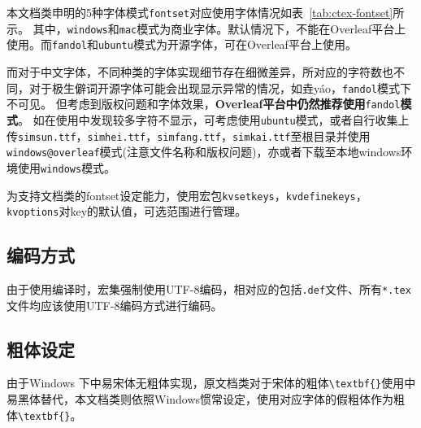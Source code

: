 本文档类申明的5种字体模式\verb|fontset|对应使用字体情况如表~\ref{tab:ctex-fontset}所示。
其中，\verb|windows|和\verb|mac|模式为商业字体。默认情况下，不能在Overleaf平台上使用。而\verb|fandol|和\verb|ubuntu|模式为开源字体，可在Overleaf平台上使用。

而对于中文字体，不同种类的字体实现细节存在细微差异，所对应的字符数也不同，对于极生僻词开源字体可能会出现显示异常的情况，如垚y\'ao，\verb|fandol|模式下不可见。
但考虑到版权问题和字体效果，\textbf{Overleaf平台中仍然推荐使用}\verb|fandol|\textbf{模式}。
如在使用中发现较多字符不显示，可考虑使用\verb|ubuntu|模式，或者自行收集上传\verb|simsun.ttf|，\verb|simhei.ttf|，\verb|simfang.ttf|，\verb|simkai.ttf|至根目录并使用\verb|windows@overleaf|模式(注意文件名称和版权问题)，亦或者下载至本地windows环境使用\verb|windows|模式。

为支持文档类的fontset设定能力，使用宏包\verb|kvsetkeys|，\verb|kvdefinekeys|，\verb|kvoptions|对key的默认值，可选范围进行管理。

\subsection{编码方式}
\label{sec:overleaf-encoding}

由于使用\XeLaTeX{}编译时，\CTeX{}宏集强制使用UTF-8编码，相对应的包括\verb|.def|文件、所有\verb|*.tex|文件均应该使用UTF-8编码方式进行编码。

\subsection{粗体设定}

由于Windows 下中易宋体无粗体实现，原文档类\pkuthss{}对于宋体的粗体\verb|\textbf{}|使用中易黑体替代，本文档类\iofupkuthss{}则依照Windows惯常设定，使用对应字体的假粗体作为粗体\verb|\textbf{}|。

